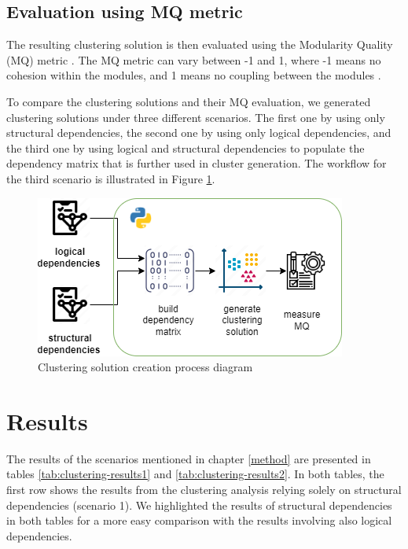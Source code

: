 \documentclass[conference]{IEEEtran}
\begin{document}
\subsection{Evaluation using MQ metric}
The resulting clustering solution is then evaluated using the Modularity Quality (MQ) metric . The MQ metric can vary between -1 and 1, where -1 means no cohesion within the modules, and 1 means no coupling between the modules \cite{mqmetric}.

To compare the clustering solutions and their MQ evaluation, we generated clustering solutions under three different scenarios. The first one by using only structural dependencies, the second one by using only logical dependencies, and the third one by using logical and structural dependencies to populate the dependency matrix that is further used in cluster generation. The workflow for the third scenario is illustrated in Figure \ref{fig:clustering-gen}.

\begin{figure}
\centering
\includegraphics[width=\columnwidth]{clustering-generation.png}
\caption{Clustering solution creation process diagram}
\label{fig:clustering-gen}
\centering
\end{figure}


\section{Results}
\label{results}


The results of the scenarios mentioned in chapter \ref{method} are presented in tables \ref{tab:clustering-results1} and \ref{tab:clustering-results2}.
 In both tables, the first row shows the results from the clustering analysis relying solely on structural dependencies (scenario 1). We highlighted the results of structural dependencies in both tables for a more easy comparison with the results involving also logical dependencies.
\end{document}
